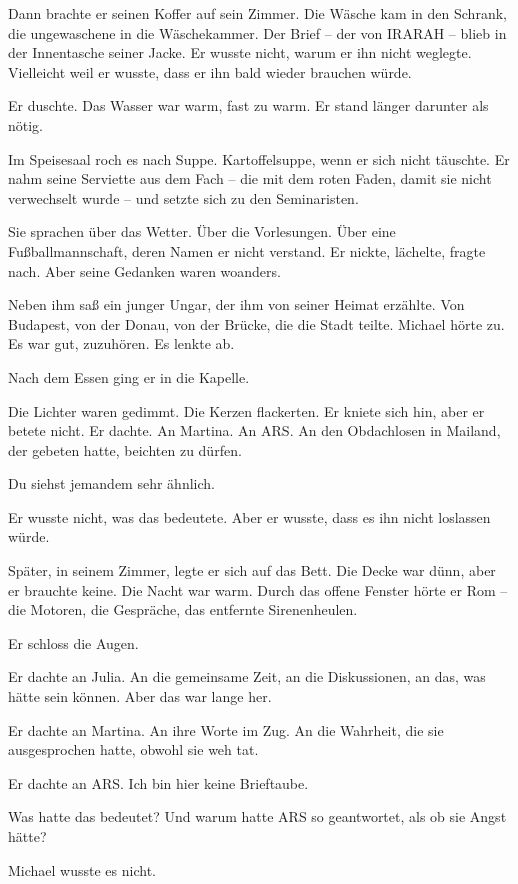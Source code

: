 \documentclass[
]{article}
\begin{document}
Dann brachte er seinen Koffer auf sein Zimmer. Die Wäsche kam in den Schrank, die ungewaschene in die Wäschekammer. Der Brief -- der von IRARAH -- blieb in der Innentasche seiner Jacke. Er wusste nicht, warum er ihn nicht weglegte. Vielleicht weil er wusste, dass er ihn bald wieder brauchen würde.

Er duschte. Das Wasser war warm, fast zu warm. Er stand länger darunter als nötig.

Im Speisesaal roch es nach Suppe. Kartoffelsuppe, wenn er sich nicht täuschte. Er nahm seine Serviette aus dem Fach -- die mit dem roten Faden, damit sie nicht verwechselt wurde -- und setzte sich zu den Seminaristen.

Sie sprachen über das Wetter. Über die Vorlesungen. Über eine Fußballmannschaft, deren Namen er nicht verstand. Er nickte, lächelte, fragte nach. Aber seine Gedanken waren woanders.

Neben ihm saß ein junger Ungar, der ihm von seiner Heimat erzählte. Von Budapest, von der Donau, von der Brücke, die die Stadt teilte. Michael hörte zu. Es war gut, zuzuhören. Es lenkte ab.

Nach dem Essen ging er in die Kapelle.

Die Lichter waren gedimmt. Die Kerzen flackerten. Er kniete sich hin, aber er betete nicht. Er dachte. An Martina. An ARS. An den Obdachlosen in Mailand, der gebeten hatte, beichten zu dürfen.

Du siehst jemandem sehr ähnlich.

Er wusste nicht, was das bedeutete. Aber er wusste, dass es ihn nicht loslassen würde.

Später, in seinem Zimmer, legte er sich auf das Bett. Die Decke war dünn, aber er brauchte keine. Die Nacht war warm. Durch das offene Fenster hörte er Rom -- die Motoren, die Gespräche, das entfernte Sirenenheulen.

Er schloss die Augen.

Er dachte an Julia. An die gemeinsame Zeit, an die Diskussionen, an das, was hätte sein können. Aber das war lange her.

Er dachte an Martina. An ihre Worte im Zug. An die Wahrheit, die sie ausgesprochen hatte, obwohl sie weh tat.

Er dachte an ARS. Ich bin hier keine Brieftaube.

Was hatte das bedeutet? Und warum hatte ARS so geantwortet, als ob sie Angst hätte?

Michael wusste es nicht.
\end{document}
